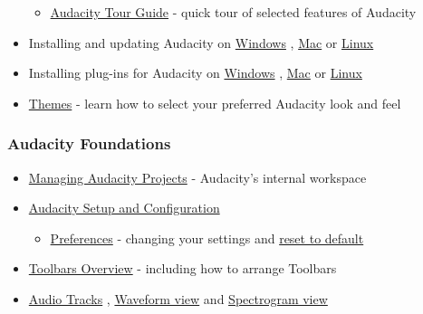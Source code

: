 \begin{multicols}{2}
\begin{itemize}
\begin{itemize}
\item 
\hyperref[\foo{man:audacity:tour:guide:}]{Audacity Tour Guide}
 - quick tour of selected features of Audacity
\end{itemize}

\item Installing and updating Audacity on 
\hyperref[\foo{man:installing:and:updating:audacity:on:windows:}]{Windows}
, 
\hyperref[\foo{man:installing:and:updating:audacity:on:mac:os:x:}]{Mac}
 or 
\hyperref[\foo{man:installing:and:updating:audacity:on:linux:}]{Linux}

\item Installing plug-ins for Audacity on 
\hyperref[\foo{man:installing:effect:generator:and:analyzer:plug:ins:on:windows:}]{Windows}
, 
\hyperref[\foo{man:installing:effect:generator:and:analyzer:plug:ins:on:mac:os:x:}]{Mac}
 or 
\hyperref[\foo{man:installing:effect:generator:and:analyzer:plug:ins:on:linux:}]{Linux}

\item 
\hyperref[\foo{man:themes:}]{Themes}
 - learn how to select your preferred Audacity look and feel
\end{itemize}

\subsubsection{Audacity Foundations}
\begin{itemize}
\item 
\hyperref[\foo{man:audacity:projects:}]{Managing Audacity Projects}
 - Audacity's internal workspace 
\item 
\hyperref[\foo{man:audacity:setup:and:configuration:}]{Audacity Setup and Configuration}

\begin{itemize}
\item 
\hyperref[\foo{man:preferences:}]{Preferences}
 - changing your settings and 
\hyperref[\foo{man:faq:installation:and:plug:ins:reset}]{reset to default}

\end{itemize}

\item 
\hyperref[\foo{man:toolbars:overview:}]{Toolbars Overview}
 - including how to arrange Toolbars
\item 
\hyperref[\foo{man:audio:tracks:}]{Audio Tracks}
, 
\hyperref[\foo{man:audacity:waveform:}]{Waveform view}
 and 
\hyperref[\foo{man:spectrogram:view:}]{Spectrogram view}


\end{itemize}
\end{multicols}
